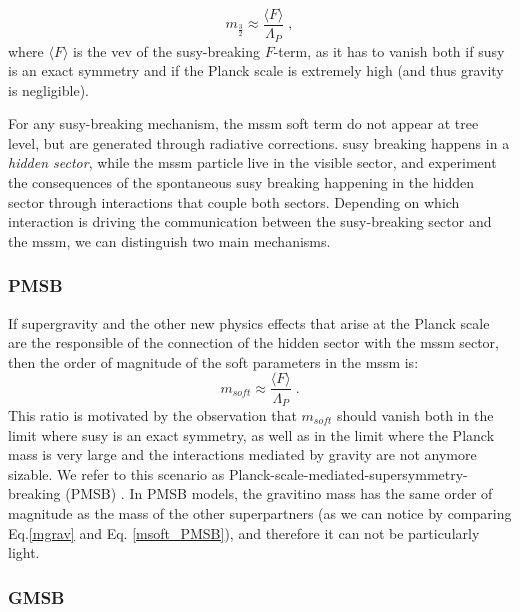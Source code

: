 \begin{equation}
m_{\frac{3}{2}} \approx \frac{\langle F \rangle}{\Lambda_P} \; ,
\label{mgrav}
\end{equation}
\noindent where $\langle F \rangle$ is the \gls{vev} of the \gls{susy}-breaking $F$-term, as it has to vanish both if \gls{susy} is an exact symmetry and if the Planck scale is extremely high (and thus gravity is negligible). 

For any \gls{susy}-breaking mechanism, the \gls{mssm} soft term do not appear at tree level, but are generated through radiative corrections. \gls{susy} breaking happens in a \textit{hidden sector}, while the \gls{mssm} particle live in the visible sector, and experiment the consequences of the spontaneous \gls{susy} breaking happening in the hidden sector through interactions that couple both sectors. Depending on which interaction is driving the communication between the \gls{susy}-breaking sector and the \gls{mssm}, we can distinguish two main mechanisms.

\subsubsection*{PMSB} 

If supergravity and the other new physics effects that arise at the Planck scale are the responsible of the connection of the hidden sector with the \gls{mssm} sector, then the order of magnitude of the soft parameters in the \gls{mssm} is:
\begin{equation}
m_{soft} \approx \frac{\langle F \rangle}{\Lambda_P} \; .
\label{msoft_PMSB}
\end{equation}
\noindent This ratio is motivated by the observation that $m_{soft}$ should vanish both in the limit where \gls{susy} is an exact symmetry, as well as in the limit where the Planck mass is very large and the interactions mediated by gravity are not anymore sizable. We refer to this scenario as Planck-scale-mediated-supersymmetry-breaking (PMSB) \cite{PhysRevLett.49.970, BARBIERI1982343, IBANEZ198273, PhysRevD.27.2359}. In PMSB models, the gravitino mass has the same order of magnitude as the mass of the other superpartners (as we can notice by comparing Eq.\ref{mgrav} and Eq. \ref{msoft_PMSB}), and therefore it can not be particularly light. 

\subsubsection*{GMSB}

